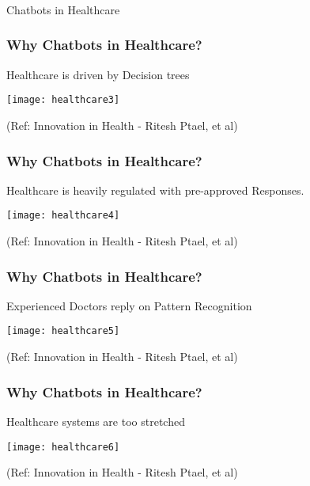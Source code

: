 \begin{frame}[fragile]\frametitle{}
\begin{center}
{\Large Chatbots in Healthcare}
\end{center}
\end{frame}

\begin{frame}[fragile]\frametitle{Why Chatbots in Healthcare?}
Healthcare is driven by Decision trees

\begin{center}
\texttt{[image: healthcare3]}
\end{center}

{\tiny (Ref: Innovation in Health - Ritesh Ptael, et al)}
\end{frame}

\begin{frame}[fragile]\frametitle{Why Chatbots in Healthcare?}
Healthcare is heavily regulated with pre-approved Responses.

\begin{center}
\texttt{[image: healthcare4]}
\end{center}

{\tiny (Ref: Innovation in Health - Ritesh Ptael, et al)}
\end{frame}

\begin{frame}[fragile]\frametitle{Why Chatbots in Healthcare?}
Experienced Doctors reply on Pattern Recognition

\begin{center}
\texttt{[image: healthcare5]}
\end{center}

{\tiny (Ref: Innovation in Health - Ritesh Ptael, et al)}
\end{frame}

\begin{frame}[fragile]\frametitle{Why Chatbots in Healthcare?}
Healthcare systems are too stretched

\begin{center}
\texttt{[image: healthcare6]}
\end{center}

{\tiny (Ref: Innovation in Health - Ritesh Ptael, et al)}
\end{frame}


